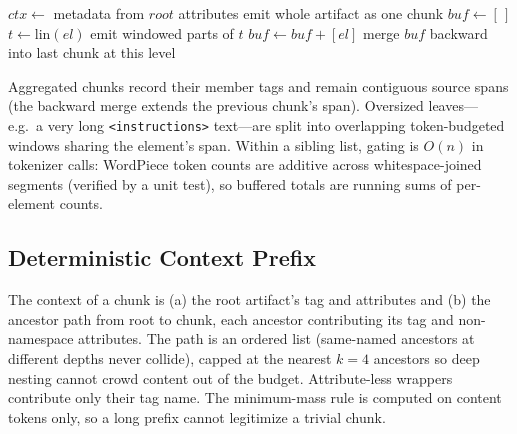 \documentclass[conference]{IEEEtran}
\begin{document}
\begin{algorithm}[t]
\caption{Structure-aware chunking with aggregation}\label{alg:chunking}
\begin{algorithmic}[1]
  \State $ctx \gets$ metadata from $root$ attributes
    \State emit whole artifact as one chunk
  \Else
    \State {}
  \EndIf
\EndProcedure
{}
  \State $buf \gets [\,]$
    \State $t \gets \mathrm{lin}(el)$
     
      \State {}
        \State {}
      \Else
        \State emit windowed parts of $t$
      \EndIf
    \Else
        \EndIf
      \State $buf \gets buf + [el]$
        \EndIf
    \EndIf
  \EndFor
    \State merge $buf$ backward into last chunk at this level
  \Else
    \State {}
  \EndIf
\EndProcedure
\end{algorithmic}
\end{algorithm}

Aggregated chunks record their member tags and remain contiguous source spans (the backward merge extends the previous chunk's span). Oversized leaves---e.g.\ a very long \texttt{<instructions>} text---are split into overlapping token-budgeted windows sharing the element's span. Within a sibling list, gating is $O(n)$ in tokenizer calls: WordPiece token counts are additive across whitespace-joined segments (verified by a unit test), so buffered totals are running sums of per-element counts.

\subsection{Deterministic Context Prefix}
The context of a chunk is (a) the root artifact's tag and attributes and (b) the ancestor path from root to chunk, each ancestor contributing its tag and non-namespace attributes. The path is an ordered list (same-named ancestors at different depths never collide), capped at the nearest $k{=}4$ ancestors so deep nesting cannot crowd content out of the budget. Attribute-less wrappers contribute only their tag name. The minimum-mass rule is computed on content tokens only, so a long prefix cannot legitimize a trivial chunk.
\end{document}
